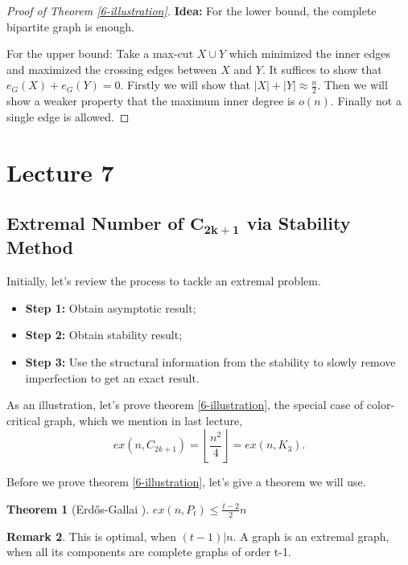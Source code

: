 \documentclass{article}
\newtheorem{theorem}{Theorem}[section]
\theoremstyle{definition}
\newtheorem{remark}[theorem]{Remark}
\def\Erdos{Erd\H{o}s}
\begin{document}
\begin{proof}[Proof of Theorem \ref{6-illustration}]
\textbf{Idea: } For the lower bound, the complete bipartite graph is enough. 

For the upper bound: Take a max-cut $X\cup Y$ which minimized the inner edges and maximized the crossing edges between $X$ and $Y$. It suffices to show that $e_G(X) + e_G(Y) = 0$. Firstly we will show that $|X| + |Y| \approx \frac{n}{2}$. Then we will show a weaker property that the maximum inner degree is $o(n)$. Finally not a single edge is allowed.
    
\end{proof}

\newpage
\section{Lecture 7}
\subsection{Extremal Number of $\boldsymbol{C_{2k+1}}$ via Stability Method}

Initially, let's review the process to tackle an extremal problem.

\begin{itemize}
    \item \textbf{Step 1:} Obtain asymptotic result;
 
    \item \textbf{Step 2:} Obtain stability result;
    
    \item \textbf{Step 3:} Use the structural information from the stability to slowly remove imperfection to get an exact result.
\end{itemize}

As an illustration, let's prove theorem \ref{6-illustration}, the special case of color-critical graph, which we mention in last lecture,
$$ex(n,C_{2k+1})=\left \lfloor \frac{n^2}{4} \right \rfloor = ex(n,K_3).$$

Before we prove theorem \ref{6-illustration}, let's give a theorem we will use.
\begin{theorem}[\Erdos{}-Gallai \cite{1959On}]\label{EG}
    $ex(n,P_t) \le \frac{t-2}{2}n$
\end{theorem}
\begin{remark}
    This is optimal, when $(t-1)|n$. A graph is an extremal graph, when all its components are complete graphs of order t-1.
\end{remark}
\end{document}
